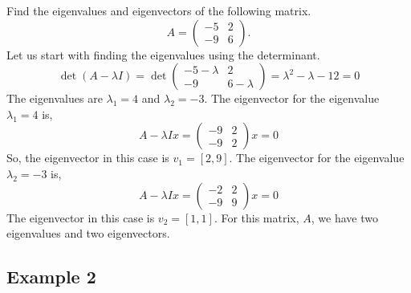 \documentclass{article}
\begin{document}
Find the eigenvalues and eigenvectors of the following matrix.
\begin{equation}
    A = \begin{pmatrix}
        -5 & 2 \\
        -9 & 6
    \end{pmatrix}.
\end{equation}
Let us start with finding the eigenvalues using the determinant.
\begin{equation}
    \det (A - \lambda I)
    = \det \begin{pmatrix}
        -5 - \lambda & 2 \\
        -9           & 6 - \lambda
    \end{pmatrix}
    = \lambda ^ 2 - \lambda - 12
    = 0
\end{equation}
The eigenvalues are $\lambda_1 = 4$ and $\lambda_2 = - 3$. The eigenvector for the eigenvalue $\lambda_1 = 4$ is,
\begin{equation}
    A - \lambda I x = \begin{pmatrix}
        - 9 & 2 \\
        - 9 & 2
    \end{pmatrix} x
    = 0
\end{equation}
So, the eigenvector in this case is $v_1 = [2, 9]$. The eigenvector for the eigenvalue $\lambda_2 = - 3$ is,
\begin{equation}
    A - \lambda I x = \begin{pmatrix}
        - 2 & 2 \\
        - 9 & 9
    \end{pmatrix} x
    = 0
\end{equation}
The eigenvector in this case is $v_2 = [1, 1]$. For this matrix, $A$, we have two eigenvalues and two eigenvectors.

\subsection{Example 2}
\end{document}
